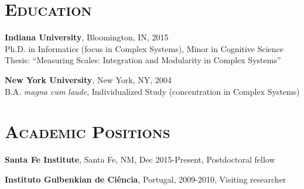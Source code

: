 \documentclass[margin,line,centered,12pt]{res}
\begin{document}
\begin{resume}



\section{\textsc{Education}}

\textbf{Indiana University}, Bloomington, IN, 2015\\
Ph.D. in Informatics (focus in Complex Systems), Minor in Cognitive
Science\\
Thesis: ``Measuring Scales: Integration and Modularity in Complex
Systems''

\textbf{New York University}, New York, NY, 2004 \\
B.A. \emph{magna cum laude}, Individualized Study (concentration in Complex
Systems)



\section{\textsc{Academic Positions}}

\textbf{Santa Fe Institute}, Santa Fe, NM, Dec 2015-Present, Postdoctoral fellow


\textbf{Instituto Gulbenkian de Ciência}, Portugal, 2009-2010, Visiting researcher


\end{resume}
\end{document}
